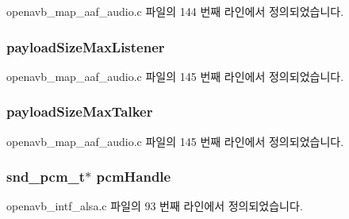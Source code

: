 openavb\+\_\+map\+\_\+aaf\+\_\+audio.\+c 파일의 144 번째 라인에서 정의되었습니다.

\subsubsection[{\texorpdfstring{payload\+Size\+Max\+Listener}{payloadSizeMaxListener}}]{ payload\+Size\+Max\+Listener}\hypertarget{structpvt__data__t_a93c440a36abbbae4ce9b1029ac0d97ee}{}\label{structpvt__data__t_a93c440a36abbbae4ce9b1029ac0d97ee}


openavb\+\_\+map\+\_\+aaf\+\_\+audio.\+c 파일의 145 번째 라인에서 정의되었습니다.

\subsubsection[{\texorpdfstring{payload\+Size\+Max\+Talker}{payloadSizeMaxTalker}}]{ payload\+Size\+Max\+Talker}\hypertarget{structpvt__data__t_ad32a7cf9c03d326d942e78f5ba4f2bf0}{}\label{structpvt__data__t_ad32a7cf9c03d326d942e78f5ba4f2bf0}


openavb\+\_\+map\+\_\+aaf\+\_\+audio.\+c 파일의 145 번째 라인에서 정의되었습니다.

\subsubsection[{\texorpdfstring{pcm\+Handle}{pcmHandle}}]{\setlength{\rightskip}{0pt plus 5cm}snd\+\_\+pcm\+\_\+t$\ast$ pcm\+Handle}\hypertarget{structpvt__data__t_a1b42323846f53777096f18d2f5ec8b04}{}\label{structpvt__data__t_a1b42323846f53777096f18d2f5ec8b04}


openavb\+\_\+intf\+\_\+alsa.\+c 파일의 93 번째 라인에서 정의되었습니다.

